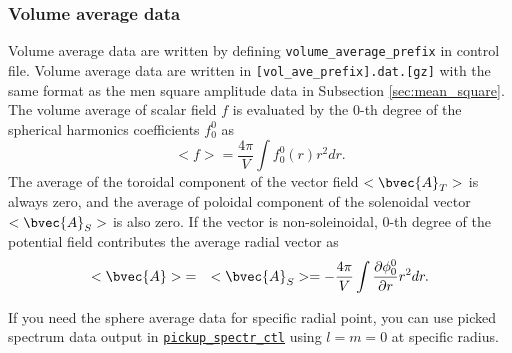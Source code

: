 \subsubsection{Volume average data}
Volume average data are written by defining {\tt volume\_average\_prefix} in control file. Volume average data are written in \verb|[vol_ave_prefix].dat.[gz]| with the same format as the men square amplitude data in Subsection \ref{sec:mean_square}. The volume average of scalar field $f$ is evaluated by the 0-th degree of the spherical harmonics coefficients $f_{0}^{0}$ as
%
\begin{equation}
<f> =   \frac{4\pi}{V} \int f_{0}^{0}(r) r^{2} dr.
\end{equation}
%
The average of the toroidal component of the vector field $<\bvec{A}_{T}>$ is always zero, and the average of poloidal component of the solenoidal vector  $<\bvec{A}_{S}>$ is also zero. If the vector is non-soleinoidal, 0-th degree of the potential field contributes the average radial vector as
%
\begin{eqnarray}
<\bvec{A}> &=& <\bvec{A}_{S}>  =  - \frac{4\pi}{V}
\int \frac{\partial \phi_{0}^{0}}{\partial r} r^{2} dr.
\end{eqnarray}
%

If you need the sphere average data for specific radial point, you can use picked spectrum data output in \hyperref[sec:pickup_spectr_ctl]{\tt pickup\_spectr\_ctl}  using $l = m = 0$ at specific radius.

